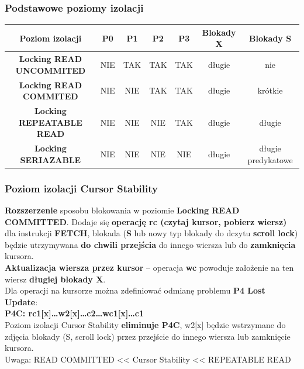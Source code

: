 \documentclass[a4paper]{article}
\begin{document}
    \subsubsection{Podstawowe poziomy izolacji}
    \begin{tabular}{|c||c|c|c|c|c|c| }
        \hline
        \textbf{Poziom izolacji} & \textbf{P0} & \textbf{P1} & \textbf{P2} & \textbf{P3} & Blokady \textbf{X} & Blokady
        \textbf{S} \\
        \hline
        \hline
        \textbf{Locking READ UNCOMMITED} & NIE & TAK & TAK & TAK & długie & nie                \\
        \hline
        \textbf{Locking READ COMMITED}   & NIE & NIE & TAK & TAK & długie & krótkie            \\
        \hline
        \textbf{Locking REPEATABLE READ} & NIE & NIE & NIE & TAK & długie & długie             \\
        \hline
        \textbf{Locking SERIAZABLE}      & NIE & NIE & NIE & NIE & długie & długie predykatowe \\
        \hline
    \end{tabular}

    \subsubsection{Poziom izolacji Cursor Stability}
    \textbf{Rozszerzenie} sposobu blokowania w poziomie \textbf{Locking READ COMMITTED}. Dodaje się \textbf{operację
    rc (czytaj kursor, pobierz wiersz)} dla instrukcji \textbf{FETCH}, blokada (\textbf{S} lub nowy typ blokady do
    dczytu \textbf{scroll lock}) będzie utrzymywana \textbf{do chwili przejścia} do innego wiersza lub do
    \textbf{zamknięcia} kursora.\\

    \textbf{Aktualizacja wiersza przez kursor} – operacja \textbf{wc} powoduje założenie na ten wiersz \textbf{długiej
    blokady X}.\\

    Dla operacji na kursorze można zdefiniować odmianę problemu \textbf{P4 Lost Update}:\\
    \textbf{P4C: rc1[x]\ldots w2[x]\ldots c2\ldots wc1[x]\ldots c1}\\

    Poziom izolacji Cursor Stability \textbf{eliminuje P4C}, w2[x] będzie wstrzymane do zdjęcia blokady (S, scroll lock)
    przez przejście do innego wiersza lub zamknięcie kursora.\\
    Uwaga: READ COMMITTED << Cursor Stability << REPEATABLE READ
\end{document}
